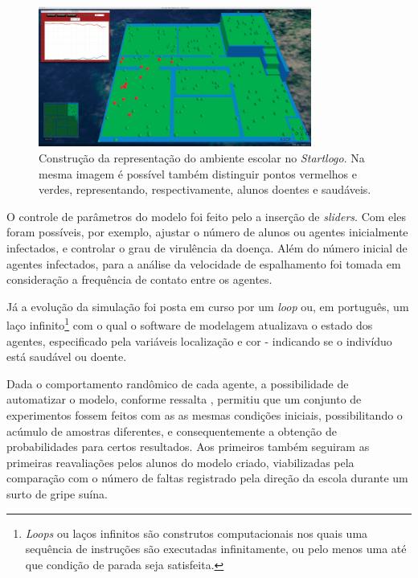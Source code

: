 \begin{figure}[!htb]
  \caption{Construção da representação do ambiente escolar no \textit{Startlogo}. Na mesma imagem é possível também distinguir pontos vermelhos e verdes, representando, respectivamente, alunos doentes e saudáveis.}
  \begin{center}
    \includegraphics[width=0.8\textwidth]{imagens/layout-starlogo}
  \end{center}
  \label{fig:starlogo}
\end{figure}

O controle de parâmetros do modelo foi feito pelo a inserção de \textit{sliders}. Com eles foram possíveis, por exemplo, ajustar o número de alunos ou agentes inicialmente infectados, e controlar o grau de virulência da doença. Além do número inicial de agentes infectados, para a análise da velocidade de espalhamento foi tomada em consideração a frequência de contato entre os agentes. 

Já a evolução da simulação foi posta em curso por um \textit{loop} ou, em português, um laço infinito\footnote{\textit{Loops} ou laços infinitos são construtos computacionais nos quais uma sequência de instruções são executadas infinitamente, ou pelo menos uma até que condição de parada seja satisfeita.} com o qual o software de modelagem atualizava o estado dos agentes, especificado pela variáveis localização e cor - indicando se o indivíduo está saudável ou doente. 

Dada o comportamento randômico de cada agente, a possibilidade de automatizar o modelo, conforme ressalta , permitiu que um conjunto de experimentos fossem feitos com as as mesmas condições iniciais, possibilitando o acúmulo de amostras diferentes, e consequentemente a obtenção de probabilidades para certos resultados. Aos primeiros também seguiram as primeiras reavaliações pelos alunos do modelo criado, viabilizadas pela comparação com o número de faltas registrado pela direção da escola durante um surto de gripe suína. 

